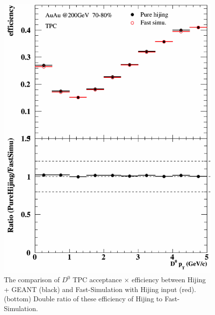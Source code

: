 \documentclass[a4paper]{article}
\begin{document}
\begin{figure}[htbp]
\begin{minipage}[htbp]{0.47\linewidth}
\includegraphics[width=1.0\textwidth,angle=0]{fig/70_80_1.png} 
\caption{ The comparison of $D^0$ TPC acceptance $\times$ efficiency between Hijing + GEANT (black) and Fast-Simulation with Hijing input (red). (bottom) Double ratio of these efficiency of Hijing to Fast-Simulation.\label{70_80_1}}
\end{minipage}
\end{figure}
\end{document}
